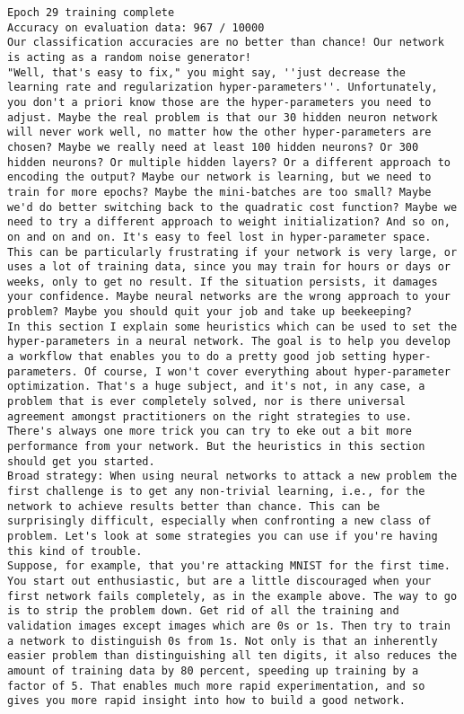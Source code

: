 \begin{lstlisting}
Epoch 29 training complete
Accuracy on evaluation data: 967 / 10000
Our classification accuracies are no better than chance! Our network is acting as a random noise generator!
"Well, that's easy to fix," you might say, ''just decrease the learning rate and regularization hyper-parameters''. Unfortunately, you don't a priori know those are the hyper-parameters you need to adjust. Maybe the real problem is that our 30 hidden neuron network will never work well, no matter how the other hyper-parameters are chosen? Maybe we really need at least 100 hidden neurons? Or 300 hidden neurons? Or multiple hidden layers? Or a different approach to encoding the output? Maybe our network is learning, but we need to train for more epochs? Maybe the mini-batches are too small? Maybe we'd do better switching back to the quadratic cost function? Maybe we need to try a different approach to weight initialization? And so on, on and on and on. It's easy to feel lost in hyper-parameter space. This can be particularly frustrating if your network is very large, or uses a lot of training data, since you may train for hours or days or weeks, only to get no result. If the situation persists, it damages your confidence. Maybe neural networks are the wrong approach to your problem? Maybe you should quit your job and take up beekeeping?
In this section I explain some heuristics which can be used to set the hyper-parameters in a neural network. The goal is to help you develop a workflow that enables you to do a pretty good job setting hyper-parameters. Of course, I won't cover everything about hyper-parameter optimization. That's a huge subject, and it's not, in any case, a problem that is ever completely solved, nor is there universal agreement amongst practitioners on the right strategies to use. There's always one more trick you can try to eke out a bit more performance from your network. But the heuristics in this section should get you started.
Broad strategy: When using neural networks to attack a new problem the first challenge is to get any non-trivial learning, i.e., for the network to achieve results better than chance. This can be surprisingly difficult, especially when confronting a new class of problem. Let's look at some strategies you can use if you're having this kind of trouble.
Suppose, for example, that you're attacking MNIST for the first time. You start out enthusiastic, but are a little discouraged when your first network fails completely, as in the example above. The way to go is to strip the problem down. Get rid of all the training and validation images except images which are 0s or 1s. Then try to train a network to distinguish 0s from 1s. Not only is that an inherently easier problem than distinguishing all ten digits, it also reduces the amount of training data by 80 percent, speeding up training by a factor of 5. That enables much more rapid experimentation, and so gives you more rapid insight into how to build a good network.

\end{lstlisting}
